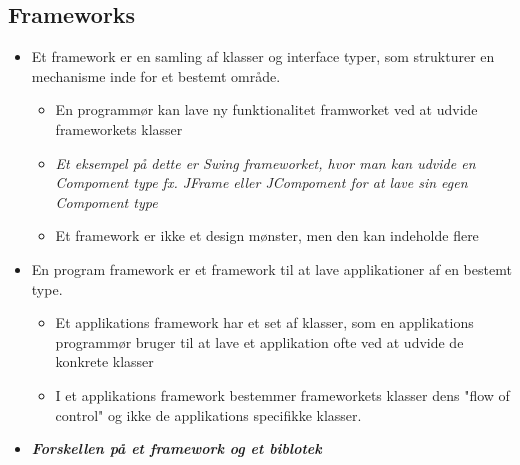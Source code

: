 \documentclass{article}
\begin{document}
\subsection{Frameworks}
\begin{itemize}
	\item Et framework er en samling af klasser og interface typer, som strukturer en mechanisme inde for et bestemt område.
	\begin{itemize}
		\item En programmør kan lave ny funktionalitet framworket ved at udvide frameworkets klasser 
		\item \textit{Et eksempel på dette er Swing frameworket, hvor man kan udvide en Compoment type fx. JFrame eller JCompoment for at lave sin egen Compoment type}
		\item Et framework er ikke et design mønster, men den kan indeholde flere 
	\end{itemize}
	\item En program framework er et framework til at lave applikationer af en bestemt type.
	\begin{itemize}
		\item Et applikations framework har et set af klasser, som en applikations programmør bruger til at lave et applikation ofte ved at udvide de konkrete klasser
		\item I et applikations framework bestemmer frameworkets klasser dens "flow of control" og ikke de applikations specifikke klasser. 
	\end{itemize}
	\item \textbf{\textit{Forskellen på et framework og et biblotek}}
\end{itemize}
\end{document}
